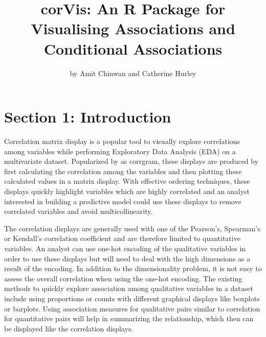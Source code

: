 \title{corVis: An R Package for Visualising Associations and Conditional
Associations}
\author{by Amit Chinwan and Catherine Hurley}

\maketitle


\hypertarget{section-1-introduction}{%
\section{Section 1: Introduction}\label{section-1-introduction}}

Correlation matrix display is a popular tool to visually explore
correlations among variables while performing Exploratory Data Analysis
(EDA) on a multivariate dataset. Popularized by
\citet{friendly2002corrgrams} as corrgram, these displays are produced
by first calculating the correlation among the variables and then
plotting these calculated values in a matrix display. With effective
ordering techniques, these displays quickly highlight variables which
are highly correlated and an analyst interested in building a predictive
model could use these displays to remove correlated variables and avoid
multicollinearity.

The correlation displays are generally used with one of the Pearson's,
Spearman's or Kendall's correlation coefficient and are therefore
limited to quantitative variables. An analyst can use one-hot encoding
of the qualitative variables in order to use these displays but will
need to deal with the high dimensions as a result of the encoding. In
addition to the dimensionality problem, it is not easy to assess the
overall correlation when using the one-hot encoding. The existing
methods to quickly explore association among qualitative variables in a
dataset include using proportions or counts with different graphical
displays like boxplots or barplots. Using association measures for
qualitative pairs similar to correlation for quantitative pairs will
help in summarizing the relationship, which then can be displayed like
the correlation displays.

